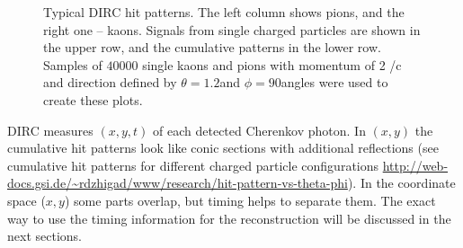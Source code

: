 \begin{figure}[!h]
\caption{\label{pic:hitpat1}
Typical \gluex DIRC hit patterns. The left column shows pions, and the right one -- kaons. 
Signals from single charged particles are shown in the upper row, and the cumulative patterns in the lower row.
Samples of $40000$ single kaons and pions with momentum of 2 {\gev}/c and direction defined by $\theta = 1.2$\mydeg and $\phi = 90$\mydeg angles were used to create these plots.
}
\end{figure}


DIRC measures $(x,y,t)$ of each detected Cherenkov photon. In $(x,y)$ the cumulative hit patterns look like conic sections with additional reflections (see cumulative hit patterns for different charged particle configurations \url{http://web-docs.gsi.de/~rdzhigad/www/research/hit-pattern-vs-theta-phi}). In the coordinate space ($x ,y$) some parts overlap, but timing helps to separate them.
The exact way to use the timing information for the reconstruction will be discussed in the next sections.
